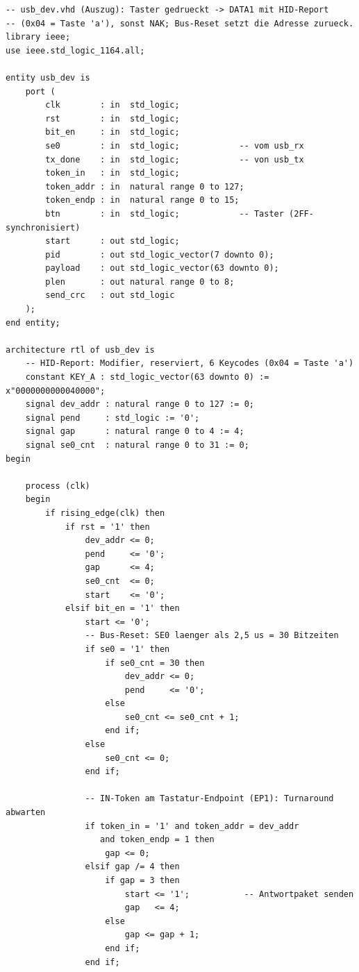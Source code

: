 \documentclass[a4paper,11pt]{article}
\begin{document}
\begin{verbatim}
-- usb_dev.vhd (Auszug): Taster gedrueckt -> DATA1 mit HID-Report
-- (0x04 = Taste 'a'), sonst NAK; Bus-Reset setzt die Adresse zurueck.
library ieee;
use ieee.std_logic_1164.all;

entity usb_dev is
    port (
        clk        : in  std_logic;
        rst        : in  std_logic;
        bit_en     : in  std_logic;
        se0        : in  std_logic;            -- vom usb_rx
        tx_done    : in  std_logic;            -- von usb_tx
        token_in   : in  std_logic;
        token_addr : in  natural range 0 to 127;
        token_endp : in  natural range 0 to 15;
        btn        : in  std_logic;            -- Taster (2FF-synchronisiert)
        start      : out std_logic;
        pid        : out std_logic_vector(7 downto 0);
        payload    : out std_logic_vector(63 downto 0);
        plen       : out natural range 0 to 8;
        send_crc   : out std_logic
    );
end entity;

architecture rtl of usb_dev is
    -- HID-Report: Modifier, reserviert, 6 Keycodes (0x04 = Taste 'a')
    constant KEY_A : std_logic_vector(63 downto 0) := x"0000000000040000";
    signal dev_addr : natural range 0 to 127 := 0;
    signal pend     : std_logic := '0';
    signal gap      : natural range 0 to 4 := 4;
    signal se0_cnt  : natural range 0 to 31 := 0;
begin

    process (clk)
    begin
        if rising_edge(clk) then
            if rst = '1' then
                dev_addr <= 0;
                pend     <= '0';
                gap      <= 4;
                se0_cnt  <= 0;
                start    <= '0';
            elsif bit_en = '1' then
                start <= '0';
                -- Bus-Reset: SE0 laenger als 2,5 us = 30 Bitzeiten
                if se0 = '1' then
                    if se0_cnt = 30 then
                        dev_addr <= 0;
                        pend     <= '0';
                    else
                        se0_cnt <= se0_cnt + 1;
                    end if;
                else
                    se0_cnt <= 0;
                end if;

                -- IN-Token am Tastatur-Endpoint (EP1): Turnaround abwarten
                if token_in = '1' and token_addr = dev_addr
                   and token_endp = 1 then
                    gap <= 0;
                elsif gap /= 4 then
                    if gap = 3 then
                        start <= '1';           -- Antwortpaket senden
                        gap   <= 4;
                    else
                        gap <= gap + 1;
                    end if;
                end if;


\end{verbatim}
\end{document}
